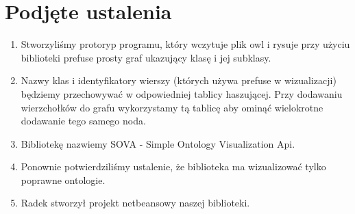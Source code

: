 \documentclass[a4paper,10pt]{article}
\begin{document}
\section{Podjęte ustalenia}
\begin{enumerate}
\item Stworzyliśmy protoryp programu, który wczytuje plik owl i rysuje przy użyciu biblioteki prefuse prosty graf ukazujący klasę i jej subklasy.
\item Nazwy klas i identyfikatory wierszy (których używa prefuse w wizualizacji) będziemy przechowywać w odpowiedniej tablicy haszującej. Przy dodawaniu wierzchołków do grafu wykorzystamy tą tablicę aby ominąć wielokrotne dodawanie tego samego noda.
\item Bibliotekę nazwiemy SOVA - Simple Ontology Visualization Api.
\item Ponownie potwierdziliśmy ustalenie, że biblioteka ma wizualizować tylko poprawne ontologie.
\item Radek stworzył projekt netbeansowy naszej biblioteki.
\end{enumerate}



\clearpage
{}
{}

\end{document}
